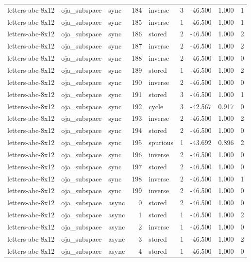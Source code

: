 \begin{tabular}{lllrlrrrr}
letters-abc-8x12 & oja\_subspace & sync & 184 & inverse & 3 & -46.500 & 1.000 & 1 \\
letters-abc-8x12 & oja\_subspace & sync & 185 & inverse & 1 & -46.500 & 1.000 & 1 \\
letters-abc-8x12 & oja\_subspace & sync & 186 & stored & 2 & -46.500 & 1.000 & 2 \\
letters-abc-8x12 & oja\_subspace & sync & 187 & inverse & 2 & -46.500 & 1.000 & 2 \\
letters-abc-8x12 & oja\_subspace & sync & 188 & inverse & 2 & -46.500 & 1.000 & 0 \\
letters-abc-8x12 & oja\_subspace & sync & 189 & stored & 1 & -46.500 & 1.000 & 2 \\
letters-abc-8x12 & oja\_subspace & sync & 190 & inverse & 2 & -46.500 & 1.000 & 0 \\
letters-abc-8x12 & oja\_subspace & sync & 191 & stored & 3 & -46.500 & 1.000 & 1 \\
letters-abc-8x12 & oja\_subspace & sync & 192 & cycle & 3 & -42.567 & 0.917 & 0 \\
letters-abc-8x12 & oja\_subspace & sync & 193 & inverse & 2 & -46.500 & 1.000 & 2 \\
letters-abc-8x12 & oja\_subspace & sync & 194 & stored & 2 & -46.500 & 1.000 & 0 \\
letters-abc-8x12 & oja\_subspace & sync & 195 & spurious & 1 & -43.692 & 0.896 & 2 \\
letters-abc-8x12 & oja\_subspace & sync & 196 & inverse & 2 & -46.500 & 1.000 & 0 \\
letters-abc-8x12 & oja\_subspace & sync & 197 & stored & 2 & -46.500 & 1.000 & 0 \\
letters-abc-8x12 & oja\_subspace & sync & 198 & inverse & 2 & -46.500 & 1.000 & 1 \\
letters-abc-8x12 & oja\_subspace & sync & 199 & inverse & 2 & -46.500 & 1.000 & 0 \\
letters-abc-8x12 & oja\_subspace & async & 0 & stored & 2 & -46.500 & 1.000 & 0 \\
letters-abc-8x12 & oja\_subspace & async & 1 & stored & 1 & -46.500 & 1.000 & 2 \\
letters-abc-8x12 & oja\_subspace & async & 2 & inverse & 1 & -46.500 & 1.000 & 0 \\
letters-abc-8x12 & oja\_subspace & async & 3 & stored & 1 & -46.500 & 1.000 & 2 \\
letters-abc-8x12 & oja\_subspace & async & 4 & stored & 1 & -46.500 & 1.000 & 0 \\

\end{tabular}
